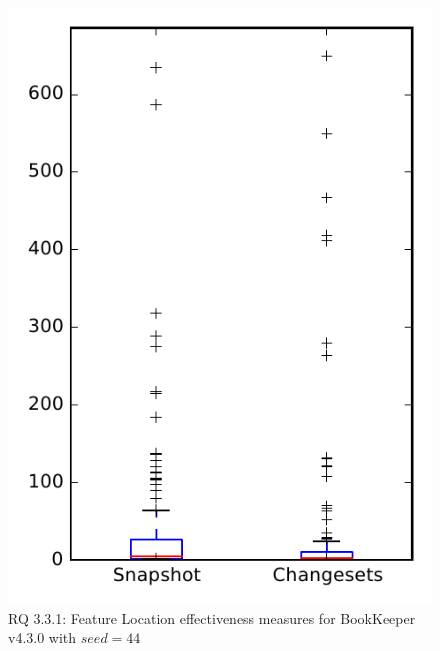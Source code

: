
\begin{figure}
\centering
\includegraphics[height=0.4\textheight]{figures/flt_seed/rq1_bookkeeper_44}
\caption{RQ 3.3.1: Feature Location effectiveness measures for BookKeeper v4.3.0 with $seed=44$}
\label{fig:flt_seed:rq1:bookkeeper}
\end{figure}
